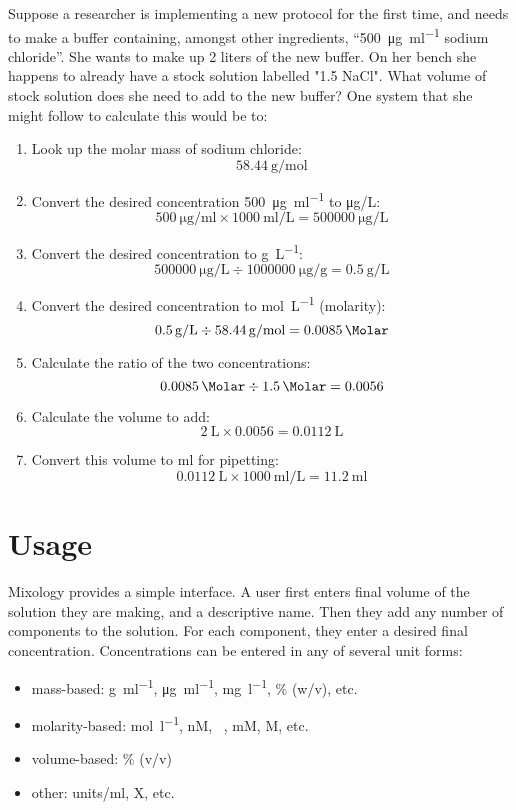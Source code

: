 \documentclass[times, twoside, watermark]{zHenriquesLab-StyleBioRxiv}
\begin{document}
Suppose a researcher is implementing a new protocol for the first time, and needs to make a buffer containing, amongst other ingredients, ``\SI[per-mode=symbol]{500}{\ug\per\ml} sodium chloride''. She wants to make up 2 liters of the new buffer. On her bench she happens to already have a stock solution labelled "\SI{1.5}{\Molar} NaCl". What volume of stock solution does she need to add to the new buffer? One system that she might follow to calculate this would be to:
\begin{enumerate}
    \item Look up the molar mass of sodium chloride: $$\SI[per-mode=symbol]{58.44}{\g\per\mol}$$
    \item Convert the desired concentration \SI[per-mode=symbol]{500}{\ug\per\ml} to \si[per-mode=symbol]{\ug\per\liter}: $$\SI[per-mode=symbol]{500}{\ug\per\ml} \times \SI{1000}{\ml\per\liter} = \SI{500000}{\ug\per\liter} $$
   \item  Convert the desired concentration to \si{\g\per\liter}:  $$ \SI{500000}{\ug\per\liter} \div \SI{1000000}{\ug\per\gram} = \SI{0.5}{\g\per\liter} $$ 
 \item Convert the desired concentration to \si{\mol\per\liter} (molarity): 
 $$ \SI{0.5}{\g\per\liter} \div \SI{58.44}{\g\per\mol} = \SI{0.0085}{\Molar} $$ 
 \item Calculate the ratio of the two concentrations:
  $$ \SI{0.0085}{\Molar} \div \SI{1.5}{\Molar} = \num{0.0056} $$ 
 \item Calculate the volume to add:
 $$ \SI{2}{\liter} \times \num{0.0056} = \SI{0.0112}{\liter} $$ 
 \item Convert this volume to  \si{\ml} for pipetting:
  $$ \SI{0.0112}{\liter} \times \SI{1000}{\ml\per\liter} = \SI{11.2}{\ml} $$ 
\end{enumerate}



\section*{Usage}

Mixology provides a simple interface. A user first enters final volume of the solution they are making, and a descriptive name. Then they add any number of components to the solution. For each component, they enter a desired final concentration. Concentrations can be entered in any of several unit forms:
\begin{itemize}
    \item mass-based:  \si{\g\per\ml}, \si{\ug\per\ml}, \si{\mg\per\l}, \% (w/v), etc.
    \item molarity-based: \si{\mol\per\l}, nM, \si{\micro\Molar}, mM,  M, etc.
    \item volume-based: \% (v/v)
    \item other: units/ml, X, etc.
\end{itemize}
\end{document}
